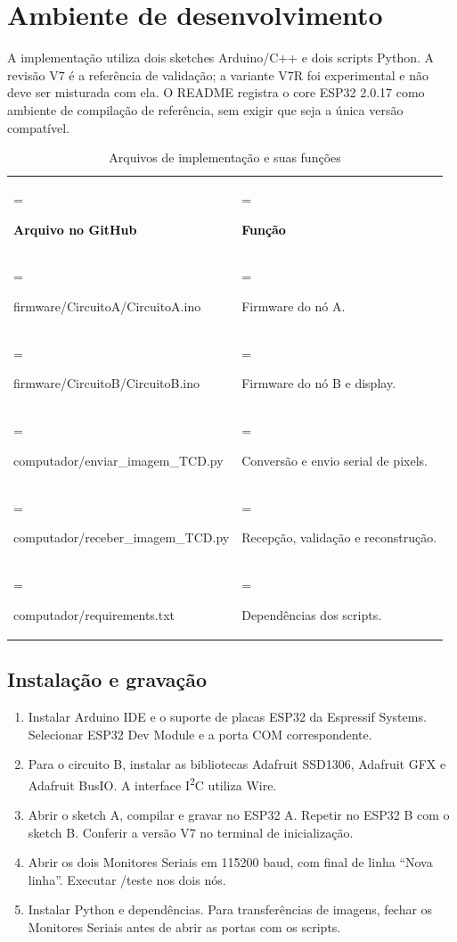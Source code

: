 \clearpage\section{Ambiente de desenvolvimento}
A implementação utiliza dois sketches Arduino/C++ e dois scripts Python. A revisão V7 é a referência de validação; a variante V7R foi experimental e não deve ser misturada com ela. O README registra o core ESP32 2.0.17 como ambiente de compilação de referência, sem exigir que seja a única versão compatível.

\begin{table}[H]\centering\small\caption{Arquivos de implementação e suas funções}\label{tab:5}
\begin{tabularx}{\linewidth}{>{\hsize=1.0309\hsize\linewidth=\hsize\raggedright\arraybackslash}X>{\hsize=0.9691\hsize\linewidth=\hsize\raggedright\arraybackslash}X}
\rowcolor{tcdtablehead} \textcolor{black}{\textbf{Arquivo no GitHub}} & \textcolor{black}{\textbf{Função}} \\
firmware/\allowbreak CircuitoA/\allowbreak CircuitoA.ino & Firmware do nó A. \\
firmware/\allowbreak CircuitoB/\allowbreak CircuitoB.ino & Firmware do nó B e display. \\
computador/\allowbreak enviar\_{}\allowbreak imagem\_{}\allowbreak TCD.py & Conversão e envio serial de pixels. \\
computador/\allowbreak receber\_{}\allowbreak imagem\_{}\allowbreak TCD.py & Recepção, validação e reconstrução. \\
computador/\allowbreak requirements.txt & Dependências dos scripts. \\
\bottomrule\end{tabularx}\end{table}
\setcounter{subsection}{0}\subsection{Instalação e gravação}
\begin{enumerate}
\item Instalar Arduino IDE e o suporte de placas ESP32 da Espressif Systems. Selecionar ESP32 Dev Module e a porta COM correspondente.
\item Para o circuito B, instalar as bibliotecas Adafruit SSD1306, Adafruit GFX e Adafruit BusIO. A interface I\textsuperscript{2}C utiliza Wire.
\item Abrir o sketch A, compilar e gravar no ESP32 A. Repetir no ESP32 B com o sketch B. Conferir a versão V7 no terminal de inicialização.
\item Abrir os dois Monitores Seriais em 115200 baud, com final de linha “Nova linha”. Executar /teste nos dois nós.
\item Instalar Python e dependências. Para transferências de imagens, fechar os Monitores Seriais antes de abrir as portas com os scripts.
\end{enumerate}
